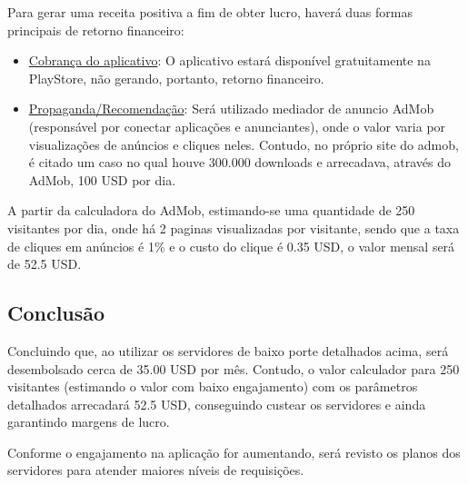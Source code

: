 Para gerar uma receita positiva a fim de obter lucro, haverá duas formas principais de retorno financeiro:

\begin{itemize}
	\item \underline{Cobrança do aplicativo}: O aplicativo estará disponível gratuitamente na PlayStore, não gerando, portanto, retorno financeiro.
	\item \underline{Propaganda/Recomendação}: Será utilizado mediador de anuncio AdMob (responsável por conectar aplicações e anunciantes), onde o valor varia por visualizações de anúncios e cliques neles. Contudo, no próprio site do admob, é citado um caso no qual houve 300.000 downloads e arrecadava, através do AdMob, 100 USD por dia. \cite{GoogleAdMob}
\end{itemize}

A partir da calculadora do AdMob, estimando-se uma quantidade de 250 visitantes por dia, onde há 2 paginas visualizadas por visitante, sendo que a taxa de cliques em anúncios é 1\% e o custo do clique é 0.35 USD, o valor mensal será de 52.5 USD.

\subsection{Conclusão}

Concluindo que, ao utilizar os servidores de baixo porte detalhados acima, será desembolsado cerca de 35.00 USD por mês. Contudo, o valor calculador para 250 visitantes (estimando o valor com baixo engajamento) com os parâmetros detalhados arrecadará 52.5 USD, conseguindo custear os servidores e ainda garantindo margens de lucro.

Conforme o engajamento na aplicação for aumentando, será revisto os planos dos servidores para atender maiores níveis de requisições.

